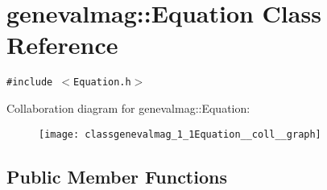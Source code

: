 \hypertarget{classgenevalmag_1_1Equation}{
\section{genevalmag::Equation Class Reference}
\label{classgenevalmag_1_1Equation}
}
{\tt \#include $<$Equation.h$>$}

Collaboration diagram for genevalmag::Equation:\nopagebreak
\begin{figure}[H]
\begin{center}
\leavevmode
\texttt{[image: classgenevalmag\_1\_1Equation\_\_coll\_\_graph]}
\end{center}
\end{figure}
\subsection*{Public Member Functions}
